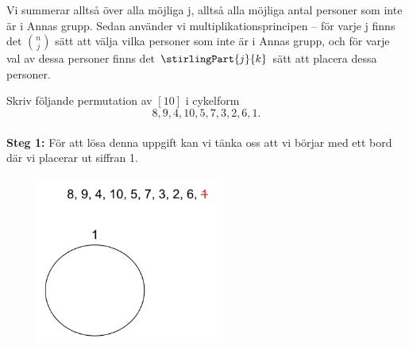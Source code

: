 \documentclass[nobib]{tufte-handout}
\begin{document}
\begin{xca2}
Vi summerar alltså över alla möjliga j, alltså alla möjliga antal personer som inte är i Annas grupp. Sedan använder vi multiplikationsprincipen – för varje j finns det ${n \choose j} $ sätt att välja vilka personer som inte är i Annas grupp, och för varje val av dessa personer finns det  $\stirlingPart{j}{k} $ sätt att placera dessa personer.
\end{xca2}

\newpage
\begin{xca2}
  Skriv följande permutation av $[10]$ i cykelform
  $$8, 9, 4, 10, 5, 7, 3, 2, 6, 1.$$
  \\
  \textbf{Steg 1:} För att lösa denna uppgift kan vi tänka oss att vi börjar med ett bord där vi placerar ut siffran 1.
  \begin{figure}[h]
\includegraphics[width=60mm]{ovning_6.1.png}
\end{figure}


\end{xca2}
\end{document}
